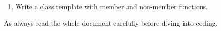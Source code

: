 
\objectives
{
    \begin{enumerate}
        \item Write a class template with member and non-member functions.
    \end{enumerate}
}

As always read the whole document carefully before diving into coding.

